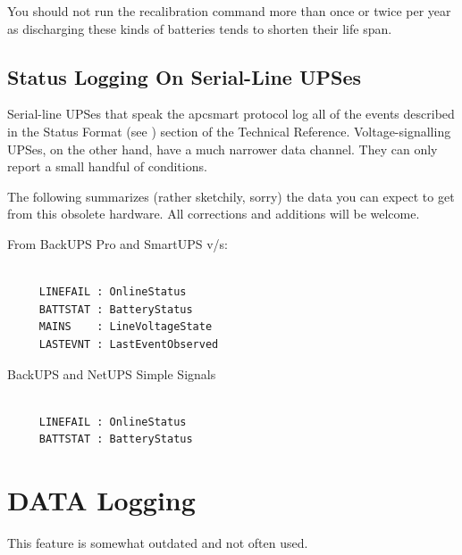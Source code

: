 {{{{{{{{{{You should not run the recalibration command more than once or twice per year
as discharging these kinds of batteries tends to shorten their life span. 

\label{Status-Logging-On-Serial_002dLine-UPSes}

\subsection*{Status Logging On Serial-Line UPSes}

Serial-line UPSes that speak the apcsmart protocol log all of the events
described in the Status Format (see 
) section of
the Technical Reference.  Voltage-signalling UPSes, on the other hand, have a
much narrower data channel.  They can only report a small handful of
conditions.  

The following summarizes (rather sketchily, sorry) the data you can expect to
get from this obsolete hardware.  All corrections and additions will be
welcome.  

From BackUPS Pro and SmartUPS v/s: 

\footnotesize
\begin{verbatim}
     
     LINEFAIL : OnlineStatus
     BATTSTAT : BatteryStatus
     MAINS    : LineVoltageState
     LASTEVNT : LastEventObserved
\end{verbatim}
\normalsize

BackUPS and NetUPS Simple Signals 

\footnotesize
\begin{verbatim}
     
     LINEFAIL : OnlineStatus
     BATTSTAT : BatteryStatus
\end{verbatim}
\normalsize

\label{DATA-Logging}

\section*{DATA Logging}

\label{index-Logging_002c-DATA-233}
\label{index-DATA-Logging-234}
This feature is somewhat outdated and not often used.  

}}}}}}}}}}
